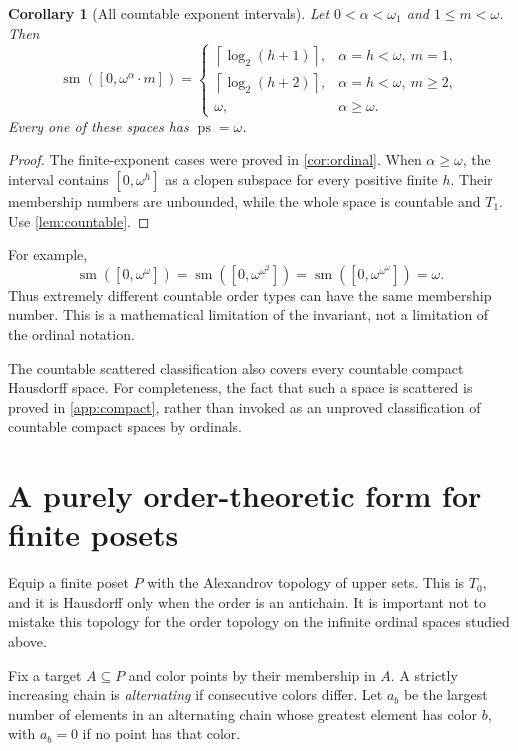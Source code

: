 \documentclass[11pt,letterpaper]{article}
\numberwithin{equation}{section}
\newtheorem{corollary}[corollary]{Corollary}
\theoremstyle{definition}
\theoremstyle{remark}
\theoremstyle{definition}
\newcommand{\sm}{\operatorname{sm}}
\newcommand{\ps}{\operatorname{ps}}
\newcommand{\ceil}[1]{\left\lceil#1\right\rceil}
\begin{document}
\begin{corollary}[All countable exponent intervals]\label{cor:allordinals}
Let $0<\alpha<\omega_1$ and $1\leq m<\omega$. Then
\[
 \sm([0,\omega^\alpha\cdot m])=
 \begin{cases}
 \ceil{\log_2(h+1)},&\alpha=h<\omega,\ m=1,\\
 \ceil{\log_2(h+2)},&\alpha=h<\omega,\ m\geq2,\\
 \omega,&\alpha\geq\omega.
 \end{cases}
\]
Every one of these spaces has $\ps=\omega$.
\end{corollary}
\begin{proof}
The finite-exponent cases were proved in \cref{cor:ordinal}. When
$\alpha\geq\omega$, the interval contains $[0,\omega^h]$ as a clopen subspace
for every positive finite $h$. Their membership numbers are unbounded, while
the whole space is countable and $T_1$. Use \cref{lem:countable}.
\end{proof}

For example,
\[
 \sm([0,\omega^\omega])
 =\sm([0,\omega^{\omega^2}])
 =\sm([0,\omega^{\omega^\omega}])=\omega.
\]
Thus extremely different countable order types can have the same membership
number. This is a mathematical limitation of the invariant, not a limitation
of the ordinal notation.

The countable scattered classification also covers every countable compact
Hausdorff space. For completeness, the fact that such a space is scattered is
proved in \cref{app:compact}, rather than invoked as an unproved classification
of countable compact spaces by ordinals.

\section{A purely order-theoretic form for finite posets}\label{sec:posets}

Equip a finite poset $P$ with the Alexandrov topology of upper sets. This is
$T_0$, and it is Hausdorff only when the order is an antichain. It is important
not to mistake this topology for the order topology on the infinite ordinal
spaces studied above.

Fix a target $A\subseteq P$ and color points by their membership in $A$.
A strictly increasing chain is \emph{alternating} if consecutive colors differ.
Let $a_b$ be the largest number of elements in an alternating chain whose
greatest element has color $b$, with $a_b=0$ if no point has that color.
\end{document}
